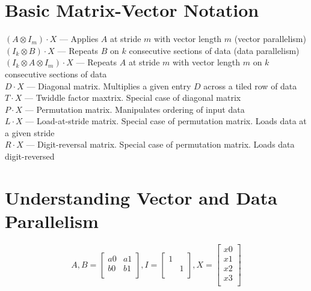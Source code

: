 \documentclass[11pt]{article}
\begin{document}
\section*{Basic Matrix-Vector Notation}
$(A\otimes I_{m})\cdot X$
--- Applies $A$ at stride $m$ with vector length $m$ (vector parallelism)\\
$(I_{k}\otimes B)\cdot X$ 
--- Repeats $B$ on $k$ consecutive sections of data (data parallelism)\\
$(I_{k}\otimes A\otimes I_{m})\cdot X$ 
--- Repeats $A$ at stride $m$ with vector length $m$ on $k$ consecutive sections of data\\
\newline
$D\cdot X$ 
--- Diagonal matrix. Multiplies a given entry $D$ across a tiled row of data\\
$T\cdot X$ 
--- Twiddle factor maxtrix. Special case of diagonal matrix\\
\newline
$P\cdot X$ 
--- Permutation matrix. Manipulates ordering of input data\\
$L\cdot X$ 
--- Load-at-stride matrix. Special case of permutation matrix. Loads data at a given stride\\
$R\cdot X$ 
--- Digit-reversal matrix. Special case of permutation matrix. Loads data digit-reversed

\newpage
\section*{Understanding Vector and Data Parallelism}
\begin{displaymath}
	A,B = 
	\begin{bmatrix}
	a0 & a1 \\
	b0 & b1 \\
	\end{bmatrix}
	, I =  
	\begin{bmatrix}
	1 &   \\
	 & 1 \\
	\end{bmatrix}
	, X =  
	\begin{bmatrix}
	x0 \\
	x1 \\
	x2 \\
	x3 \\
	\end{bmatrix}
\end{displaymath}
\end{document}
